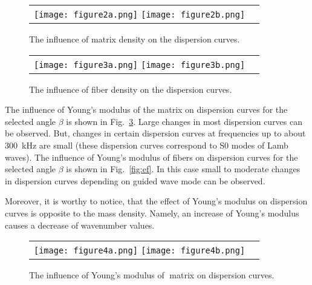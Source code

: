 \documentclass[]{spie}  %
\newcommand{\myfigscale}{0.9}
\begin{document}
\begin{figure} [ht]
	\begin{center}
		\begin{tabular}{cc} %
			\texttt{[image: figure2a.png]}
			\texttt{[image: figure2b.png]}
		\end{tabular}
	\end{center}
	\caption[] 
	{ \label{fig:rhom} 
		The influence of matrix density on the dispersion curves.}
\end{figure} 

\begin{figure} [ht]
	\begin{center}
		\begin{tabular}{cc} %
			\texttt{[image: figure3a.png]}
			\texttt{[image: figure3b.png]}
		\end{tabular}
	\end{center}
	\caption[] 
	{ \label{fig:rhof} 
		The influence of fiber density on the dispersion curves.}
\end{figure} 
The influence of Young's modulus of the matrix on dispersion curves for the selected angle 
\(\beta\) is shown in Fig.~\ref{fig:em}. 
Large changes in most dispersion curves can be observed. 
But, changes in certain dispersion curves at frequencies up to about 300~kHz are small (these dispersion curves correspond to S0 modes of Lamb waves).
The influence of Young's modulus of fibers on dispersion curves for the selected angle 
\(\beta\) is shown in Fig.~\ref{fig:ef}. 
In this case small to moderate changes in dispersion curves depending on guided wave mode can be observed. 

Moreover, it is worthy to notice, that the effect of Young's modulus on dispersion curves is opposite to the mass density. 
Namely, an increase of  Young's modulus causes a decrease of wavenumber values.
\begin{figure} [ht]
	\begin{center}
		\begin{tabular}{cc} %
			\texttt{[image: figure4a.png]}
			\texttt{[image: figure4b.png]}
		\end{tabular}
	\end{center}
	\caption[] 
	{ \label{fig:em} 
		The influence of Young's modulus of matrix on dispersion curves.}
\end{figure} 
\end{document}

